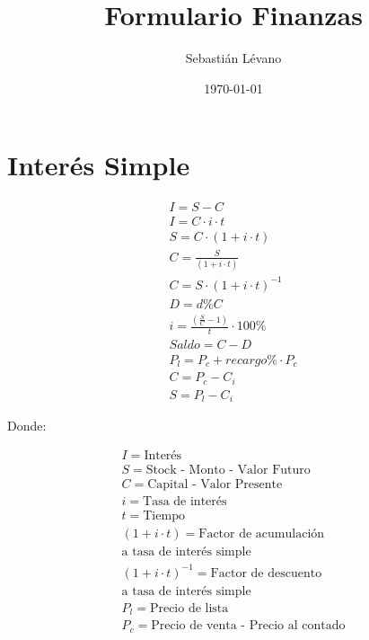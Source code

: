 \documentclass[a4paper, twocolumn]{article}
\begin{document}
\title{Formulario Finanzas}
\author{Sebastián Lévano}
\date{\today}
\maketitle




\section{Interés Simple}

\begin{gather*}
    I = S - C \\
    I = C \cdot i \cdot t \\
    S = C \cdot (1 + i \cdot t) \\
    C = \frac{S}{(1 + i \cdot t)} \\
    C = S \cdot (1 + i \cdot t)^{-1} \\
    D = d \% C \\
    i = \frac{(\frac{S}{C} - 1)}{t} \cdot 100 \% \\
    Saldo = C - D \\
    P_l = P_c + recargo \% \cdot P_c \\
    C = P_c - C_i \\
    S = P_l - C_i
\end{gather*}

Donde:

\begin{align*}
    I = \text{Interés}                                \\
    S = \text{Stock - Monto - Valor Futuro}           \\
    C = \text{Capital - Valor Presente}               \\
    i = \text{Tasa de interés}                        \\
    t = \text{Tiempo}                                 \\
    (1 + i \cdot t) = \text{Factor de acumulación}    \\
    \text{a tasa de interés simple}                   \\
    (1 + i \cdot t)^{-1} = \text{Factor de descuento} \\
    \text{a tasa de interés simple}                   \\
    P_l = \text{Precio de lista}                      \\
    P_c = \text{Precio de venta - Precio al contado}  \\
\end{align*}
\end{document}
